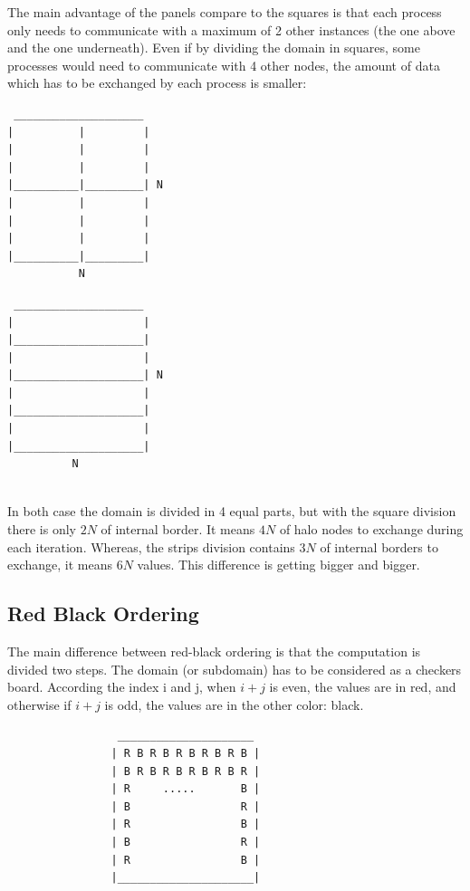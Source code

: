 \documentclass[a4paper,11pt]{article}
\begin{document}
The main advantage of the panels compare to the squares is that each process only needs to
communicate with a maximum of 2 other instances (the one above and the one underneath).
Even if by dividing the domain in squares, some processes would need to communicate with
4 other nodes, the amount of data which has to be exchanged by each process is smaller:

\begin{multicols}{2}
\begin{verbatim}
 ____________________
|          |         |
|          |         |
|          |         |
|__________|_________| N
|          |         |
|          |         |
|          |         |
|__________|_________|
           N
\end{verbatim}
\begin{verbatim}
 ____________________
|                    |
|____________________|
|                    |
|____________________| N
|                    |
|____________________|
|                    |
|____________________|
          N
           
\end{verbatim}
\end{multicols}

In both case the domain is divided in 4 equal parts, but with the square division 
there is only $2N$ of internal border. It means $4N$ of halo nodes to exchange
during each iteration. Whereas, the strips division contains $3N$ of internal borders to
exchange, it means $6N$ values. This difference is getting bigger and bigger.

\subsection{Red Black Ordering}

The main difference between red-black ordering is that the computation is divided two steps.
The domain (or subdomain) has to be considered as a checkers board. According the index i and j, when
$i+j$ is even, the values are in red, and otherwise if $i+j$ is odd, the values are in the
other color: black.

\begin{verbatim}
                 _____________________
                | R B R B R B R B R B |
                | B R B R B R B R B R |
                | R     .....       B |
                | B                 R |
                | R                 B |
                | B                 R |
                | R                 B |
                |_____________________|
\end{verbatim}
\end{document}
